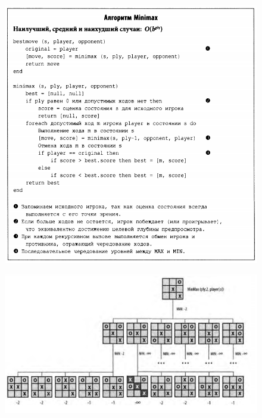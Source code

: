 \documentclass{beamer}
\begin{document}
\begin{frame}
\begin{figure}[h]
\centering
\includegraphics[scale=0.4]{images/lec05-pic03.png}
\end{figure}
\end{frame}

\begin{frame}
\begin{figure}[h]
\centering
\includegraphics[scale=0.6]{images/lec05-pic04.png}
\end{figure}
\end{frame}
\end{document}

